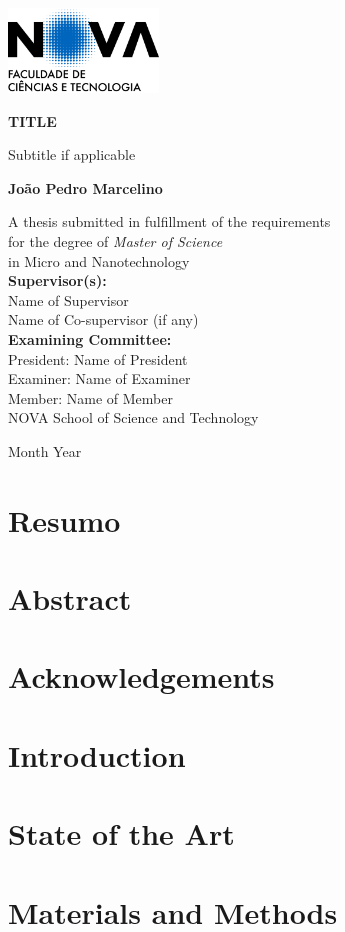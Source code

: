 \documentclass[11pt, a4paper]{report}
\newcommand{\importsection}[1]{}
\newcommand{\frontpage}{
    \begin{titlepage}
        \centering
        \includegraphics[width=0.3\textwidth]{figures/university-logo.png}\\ %
        \vspace{2cm}
        {\Huge\bfseries TITLE\par}
        \vspace{1.5cm}
        {\Large Subtitle if applicable\par}
        \vfill
        {\Large\bfseries João Pedro Marcelino\par}
        \vfill
        A thesis submitted in fulfillment of the requirements\\
        for the degree of \emph{Master of Science}\\
        in Micro and Nanotechnology\\
        \vspace{2cm}
        {\bfseries Supervisor(s):}\\[0.5em]
        Name of Supervisor\\
        Name of Co-supervisor (if any)\\[2cm]
        {\bfseries Examining Committee:}\\[0.5em]
        President: Name of President\\
        Examiner: Name of Examiner\\
        Member: Name of Member\\[2cm]
        NOVA School of Science and Technology\\
        \vspace{1cm}
        {\large Month Year\par}
    \end{titlepage}
}
\newcommand{\copyrightpage}{
    \thispagestyle{empty}
    \vspace*{0.1\textheight} %
    \importsection{copyright} %
    \cleardoublepage
}
\begin{document}
\frontpage%
\thispagestyle{empty}

\copyrightpage


\chapter*{Resumo}
\importsection{resumo} %
\cleardoublepage %

\chapter*{Abstract}
\importsection{abstract} %
\cleardoublepage %

\chapter*{Acknowledgements}
\importsection{acknowledgements}


\tableofcontents
\cleardoublepage

\listoffigures
\cleardoublepage

\listoftables
\cleardoublepage
{}


\setcounter{page}{1}

\chapter{Introduction}
\importsection{introduction}
\cleardoublepage

\chapter{State of the Art}
\importsection{stateoftheart}
\cleardoublepage

\chapter{Materials and Methods}
\importsection{methods}
\cleardoublepage
\end{document}
